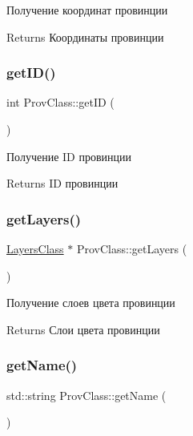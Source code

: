 Получение координат провинции 

\begin{DoxyReturn}{Returns}
Координаты провинции 
\end{DoxyReturn}
\mbox{\label{class_prov_class_a8cb7ae2b2f6bf292b789060fa719436d}} 
\subsubsection{\texorpdfstring{get\+I\+D()}{getID()}}
{\footnotesize\ttfamily int Prov\+Class\+::get\+ID (\begin{DoxyParamCaption}{ }\end{DoxyParamCaption})}



Получение ID провинции 

\begin{DoxyReturn}{Returns}
ID провинции 
\end{DoxyReturn}
\mbox{\label{class_prov_class_a49e9acf6093021eb11d116c847e07689}} 
\subsubsection{\texorpdfstring{get\+Layers()}{getLayers()}}
{\footnotesize\ttfamily \hyperlink{class_layers_class}{Layers\+Class} $\ast$ Prov\+Class\+::get\+Layers (\begin{DoxyParamCaption}{ }\end{DoxyParamCaption})}



Получение слоев цвета провинции 

\begin{DoxyReturn}{Returns}
Слои цвета провинции 
\end{DoxyReturn}
\mbox{\label{class_prov_class_accc6f1505990cae5065fdcf0669e1f59}} 
\subsubsection{\texorpdfstring{get\+Name()}{getName()}}
{\footnotesize\ttfamily std\+::string Prov\+Class\+::get\+Name (\begin{DoxyParamCaption}{ }\end{DoxyParamCaption})}



